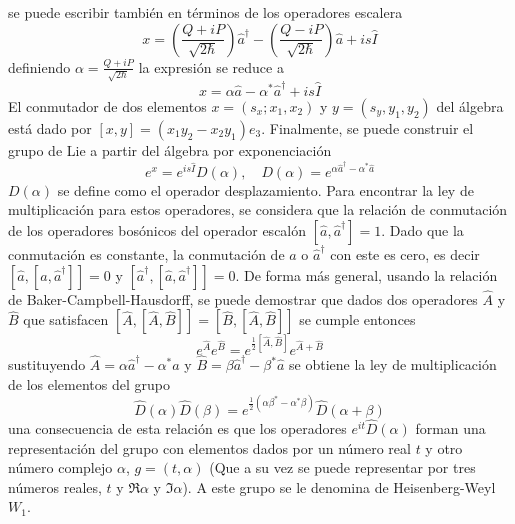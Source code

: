 se puede escribir también en términos de los operadores escalera
\begin{equation*}
  x = \left( \frac{Q+iP}{\sqrt{2\hbar}} \right)\hat{a}^{\dagger} - \left( \frac{Q-iP}{\sqrt{2\hbar}} \right)\hat{a} + is\hat{I}
\end{equation*}
definiendo $\alpha =  \frac{Q+iP}{\sqrt{2\hbar}}$ la expresión se reduce a
\begin{equation*}
  x = \alpha\hat{a} - \alpha^* \hat{a}^{\dagger} + is\hat{I}
\end{equation*}
El conmutador de dos elementos $x = (s_x; x_1, x_2)$ y $y = (s_y, y_1, y_2)$ del álgebra está dado por $[x,y] = (x_1 y_2 - x_2 y_1)e_3$. Finalmente, se puede construir el grupo de Lie a partir del álgebra por exponenciación
\begin{equation*}
  e^{x} = e^{is\hat{I}}D(\alpha), \quad D(\alpha) = e^{\alpha\hat{a}^{\dagger} - \alpha^* \hat{a}}
\end{equation*}
$D(\alpha)$ se define como el operador desplazamiento. Para encontrar la ley de multiplicación para estos operadores, se considera que la relación de conmutación de los operadores bosónicos del operador escalón $[\hat{a}, \hat{a}^{\dagger}]=1$. Dado que la conmutación es constante, la conmutación de $\hat{a}$ o $\hat{a}^{\dagger}$ con este es cero, es decir $[\hat{a}, [\hat{a}, \hat{a}^{\dagger}]] = 0$ y $[\hat{a}^{\dagger}, [\hat{a}, \hat{a}^{\dagger}]] = 0$. De forma más general, usando la relación de Baker-Campbell-Hausdorff, se puede demostrar que dados dos operadores $\hat{A}$ y $\hat{B}$ que satisfacen $[\hat{A}, [\hat{A}, \hat{B}]] = [\hat{B}, [\hat{A}, \hat{B}]]$ se cumple entonces
\begin{equation*}
  e^{\hat{A}} e^{\hat{B}} = e^{\frac{1}{2}[\hat{A}, \hat{B}]}e^{\hat{A}+\hat{B}}
\end{equation*}
sustituyendo $\hat{A} = \alpha \hat{a}^{\dagger} - \alpha^* \hat{a}$ y $\hat{B} = \beta\hat{a}^{\dagger} - \beta^*\hat{a}$ se obtiene la ley de multiplicación de los elementos del grupo
\begin{equation*}
  \hat{D}(\alpha)\hat{D}(\beta) = e^{\frac{1}{2}(\alpha\beta^* - \alpha^*\beta)}\hat{D}(\alpha+\beta)
\end{equation*}
una consecuencia de esta relación es que los operadores $e^{it}\hat{D}(\alpha)$ forman una representación del grupo con elementos dados por un número real $t$ y otro número complejo $\alpha$, $g = (t, \alpha)$ (Que a su vez se puede representar por tres números reales, $t$ y $\Re{\alpha}$ y $\Im{\alpha}$). A este grupo se le denomina de Heisenberg-Weyl $W_1$.

